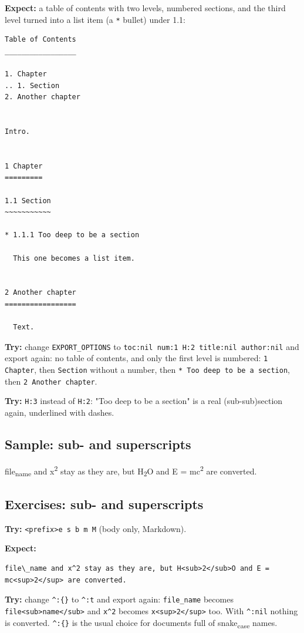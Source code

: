 \textbf{Expect:} a table of contents with two levels, numbered sections, and the
third level turned into a list item (a \texttt{*} bullet) under 1.1:

\begin{verbatim}
Table of Contents
_________________

1. Chapter
.. 1. Section
2. Another chapter


Intro.


1 Chapter
=========

1.1 Section
~~~~~~~~~~~

* 1.1.1 Too deep to be a section

  This one becomes a list item.


2 Another chapter
=================

  Text.
\end{verbatim}

\textbf{Try:} change \texttt{EXPORT\_OPTIONS} to \texttt{toc:nil num:1 H:2 title:nil author:nil}
and export again: no table of contents, and only the first level is
numbered: \texttt{1 Chapter}, then \texttt{Section} without a number, then
\texttt{* Too deep to be a section}, then \texttt{2 Another chapter}.

\textbf{Try:} \texttt{H:3} instead of \texttt{H:2}: "Too deep to be a section" is a real
(sub-sub)section again, underlined with dashes.
\subsection{Sample: sub- and superscripts}
\label{sec:org6123cb4}
file\textsubscript{name} and x\textsuperscript{2} stay as they are, but H\textsubscript{2}O and E = mc\textsuperscript{2} are converted.
\subsection{Exercises: sub- and superscripts}
\label{sec:orgd782e4f}
\textbf{Try:} \texttt{<prefix>e s b m M} (body only, Markdown).

\textbf{Expect:}

\begin{verbatim}
file\_name and x^2 stay as they are, but H<sub>2</sub>O and E = mc<sup>2</sup> are converted.
\end{verbatim}

\textbf{Try:} change \texttt{\textasciicircum{}:\{\}} to \texttt{\textasciicircum{}:t} and export again: \texttt{file\_name} becomes
\texttt{file<sub>name</sub>} and \texttt{x\textasciicircum{}2} becomes \texttt{x<sup>2</sup>} too. With \texttt{\textasciicircum{}:nil} nothing is converted. \texttt{\textasciicircum{}:\{\}} is
the usual choice for documents full of snake\textsubscript{case} names.
